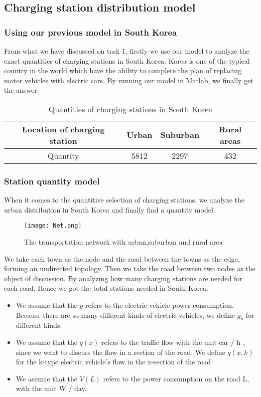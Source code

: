 \documentclass[12pt]{article}  %
\begin{document}
\subsection{Charging station distribution model}
\subsubsection{Using our previous model in South Korea}

From what we have discussed on task 1, firstly we use our model to analyze the exact quantities of charging stations in South Korea. Korea is one of the typical country in the world which have the ability to complete the plan of replacing motor vehicles with electric cars. By running our model in Matlab, we finally get the answer:
\begin{table}[H]
\caption{Quantities of charging stations in South Korea}
\begin{center}
	\begin{tabular}{cccc}
		\toprule
		Location of charging station & Urban & Suburban & Rural areas\\
		\midrule
		Quantity & 5812 & 2297 & 432\\
		\bottomrule
	\end{tabular}\label{tb:3}
\end{center}
\end{table}
\subsubsection{Station quantity model}

When it comes to the quantitive selection of charging stations, we analyze the urban distribution in South Korea and finally find a quantity model.

\begin{figure}[H]
	\centering
	\texttt{[image: Net.png]}
	\caption{The transportation network with urban,suburban and rural area}\label{fig:4}
\end{figure}

We take each town as the node and the road between the towns as the edge, forming an undirected topology. Then we take the road between two nodes as the object of discussion. By analyzing how many charging stations are needed for each road. Hence we got the total stations needed in South Korea.

\begin{itemize}
	\item We assume that the $g$ refers to the electric vehicle power consumption. Because there are so many different kinds of electric vehicles, we define ${g_k}$ for different kinds.
	\item We assume that the $q(x)$ refers to the traffic flow with the unit car / h , since we want to discuss the flow in a section of the road. We define $q(x,k)$ for the k-type electric vehicle's flow in the x-section of the road.
	\item We assume that the $V(L)$ refers to the power consumption on the road L, with the unit W / day.
\end{itemize}
\end{document}
